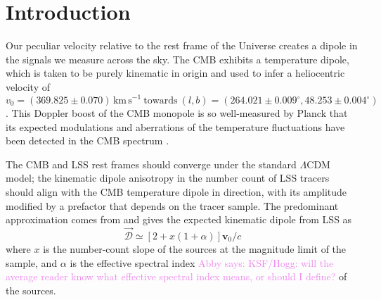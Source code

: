 \documentclass[modern]{aastex631}
\newcommand{\abby}[1]{\textcolor{violet}{Abby says: #1}}
\newcommand{\vobs}{\boldsymbol{v}_0}
\begin{document}

\section{Introduction}
Our peculiar velocity relative to the rest frame of the Universe creates a dipole in the signals we measure across the sky.
The CMB exhibits a temperature dipole, which is taken to be purely kinematic in origin and used to infer a heliocentric velocity of
\begin{equation}
    \label{eq:CMB_velocity}
    v_0 = (369.825\pm 0.070)\,\mathrm{km\, s}^{-1}\ \mathrm{towards}\ (l,b) = (264.021\pm0.009^\circ, 48.253\pm0.004^\circ)
\end{equation}
\citep{planck_collaboration_planck_2020}.
This Doppler boost of the CMB monopole is so well-measured by Planck that its expected modulations and aberrations of the temperature fluctuations have been detected in the CMB spectrum \citep{planck_collaboration_planck_2014}.

The CMB and LSS rest frames should converge under the standard $\Lambda$CDM model; the kinematic dipole anisotropy in the number count of LSS tracers should align with the CMB temperature dipole in direction, with its amplitude modified by a prefactor that depends on the tracer sample.
The predominant approximation comes from \citet{ellis_expected_1984} and gives the expected kinematic dipole from LSS as
\begin{equation}
    \label{eq:ellisbaldwin}
    \vec{\mathcal{D}} \simeq \left[2+x(1+\alpha)\right]\vobs/c
\end{equation}
where $x$ is the number-count slope of the sources at the magnitude limit of the sample, and $\alpha$ is the effective spectral index \abby{KSF/Hogg: will the average reader know what effective spectral index means, or should I define?} of the sources.
\end{document}
